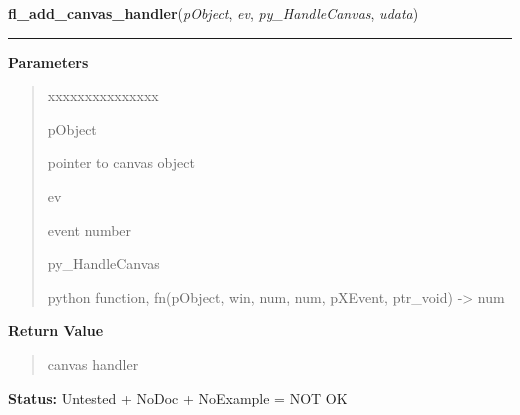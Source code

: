 \hspace{.8\funcindent}\begin{boxedminipage}{\funcwidth}

    \raggedright \textbf{fl\_add\_canvas\_handler}(\textit{pObject}, \textit{ev}, \textit{py\_HandleCanvas}, \textit{udata})

    \vspace{-1.5ex}

    \rule{\textwidth}{0.5\fboxrule}
\setlength{\parskip}{2ex}
\setlength{\parskip}{1ex}
      \textbf{Parameters}
      \vspace{-1ex}

      \begin{quote}
        \begin{Ventry}{xxxxxxxxxxxxxxx}

          \item[pObject]

          pointer to canvas object

          \item[ev]

          event number

          \item[py\_HandleCanvas]

          python function, fn(pObject, win, num, num, pXEvent, ptr\_void) 
          -{\textgreater} num

        \end{Ventry}

      \end{quote}

      \textbf{Return Value}
    \vspace{-1ex}

      \begin{quote}
      canvas handler

      \end{quote}

\textbf{Status:} Untested + NoDoc + NoExample = NOT OK



    \end{boxedminipage}

    \label{xformslib:library:fl_get_canvas_id}

    \vspace{0.5ex}

